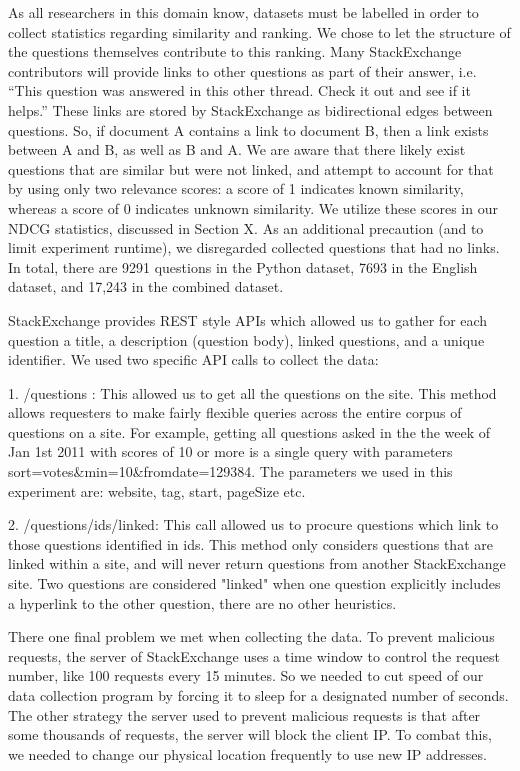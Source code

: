 \documentclass{acm_proc_article-sp}
\begin{document}
As all researchers in this domain know, datasets must be labelled in order to collect statistics regarding similarity and ranking. We chose to let the structure of the questions themselves contribute to this ranking. Many StackExchange contributors will provide links to other questions as part of their answer, i.e. ``This question was answered in this other thread. Check it out and see if it helps.” These links are stored by StackExchange as bidirectional edges between questions. So, if document A contains a link to document B, then a link exists between A and B, as well as B and A. We are aware that there likely exist questions that are similar but were not linked, and attempt to account for that by using only two relevance scores: a score of 1 indicates known similarity, whereas a score of 0 indicates unknown similarity. We utilize these scores in our NDCG statistics, discussed in Section X. As an additional precaution (and to limit experiment runtime), we disregarded collected questions that had no links. In total, there are 9291 questions in the Python dataset, 7693 in the English dataset, and 17,243 in the combined dataset. 

StackExchange provides REST style APIs which allowed us to gather for each question a title, a description (question body), linked questions, and a unique identifier. We used two specific API calls to collect the data:

1. /questions : This allowed us to get all the questions on the site. This method allows requesters to make fairly flexible queries across the entire corpus of questions on a site. For example, getting all questions asked in the the week of Jan 1st 2011 with scores of 10 or more is a single query with parameters sort=votes\&min=10\&fromdate=129384. The parameters we used in this experiment are: website, tag, start, pageSize  etc. 

2. /questions/{ids}/linked:  This call allowed us to procure questions which link to those questions identified in {ids}.  This method only considers questions that are linked within a site, and will never return questions from another StackExchange site. Two questions are considered "linked" when one question explicitly includes a hyperlink to the other question, there are no other heuristics.

There one final problem we met when collecting the data. To prevent malicious requests,  the server of StackExchange uses a time window to control the request number, like  100 requests every 15 minutes. So we needed to cut speed of our data collection program by forcing it to sleep for a designated number of seconds. The other strategy the server used to prevent malicious requests is that after some thousands of requests, the server will block the client IP. To combat this, we needed to change our physical location frequently to use new IP addresses.
\end{document}
